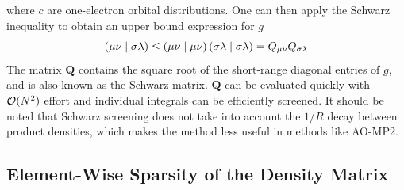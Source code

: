 \noindent where $c$ are one-electron orbital distributions. One can then apply the Schwarz inequality \cite{Hf1989} to obtain an upper bound expression for $g$
\begin{equation}
\left( \mu\nu \mid \sigma\lambda \right) \leq \left( \mu\nu \mid \mu\nu \right) \left( \sigma\lambda \mid \sigma\lambda \right) = Q_{\mu\nu} Q_{\sigma\lambda}
\end{equation}
\noindent The matrix $\mathbf{Q}$ contains the square root of the short-range diagonal entries of $g$, and is also known as the Schwarz matrix. $\mathbf{Q}$ can be evaluated quickly with $\mathcal{O}(N^{2})$ effort and individual integrals can be efficiently screened. It should be noted that Schwarz screening does not take into account the $1/R$ decay between product densities, which makes the method less useful in methods like AO-MP2.

\subsection{Element-Wise Sparsity of the Density Matrix}

